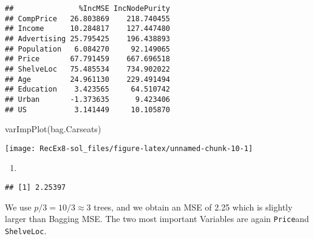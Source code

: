 \documentclass[
]{article}
\newenvironment{Shaded}{\begin{snugshade}}{\end{snugshade}}
\newcommand{\AttributeTok}[1]{\textcolor[rgb]{0.77,0.63,0.00}{#1}}
\newcommand{\ConstantTok}[1]{\textcolor[rgb]{0.00,0.00,0.00}{#1}}
\newcommand{\DecValTok}[1]{\textcolor[rgb]{0.00,0.00,0.81}{#1}}
\newcommand{\FunctionTok}[1]{\textcolor[rgb]{0.00,0.00,0.00}{#1}}
\newcommand{\NormalTok}[1]{#1}
\newcommand{\OtherTok}[1]{\textcolor[rgb]{0.56,0.35,0.01}{#1}}
\newcommand{\SpecialCharTok}[1]{\textcolor[rgb]{0.00,0.00,0.00}{#1}}
\providecommand{\tightlist}{%
  \setlength{\itemsep}{0pt}\setlength{\parskip}{0pt}}
\begin{document}
\begin{verbatim}
##               %IncMSE IncNodePurity
## CompPrice   26.803869    218.740455
## Income      10.284817    127.447480
## Advertising 25.795425    196.438893
## Population   6.084270     92.149065
## Price       67.791459    667.696518
## ShelveLoc   75.485534    734.902022
## Age         24.961130    229.491494
## Education    3.423565     64.510742
## Urban       -1.373635      9.423406
## US           3.141449     10.105870
\end{verbatim}

\begin{Shaded}
\begin{Highlighting}[]
\FunctionTok{varImpPlot}\NormalTok{(bag.Carseats)}
\end{Highlighting}
\end{Shaded}

\texttt{[image: RecEx8-sol\_files/figure-latex/unnamed-chunk-10-1]}

\begin{enumerate}
\def\labelenumi{\alph{enumi})}
\setcounter{enumi}{4}
\tightlist
\item
\end{enumerate}

\begin{Shaded}
\end{Shaded}

\begin{verbatim}
## [1] 2.25397
\end{verbatim}

We use \(p/3 = 10/3 \approx 3\) trees, and we obtain an MSE of 2.25
which is slightly larger than Bagging MSE. The two most important
Variables are again \texttt{Price}and \texttt{ShelveLoc}.
\end{document}
